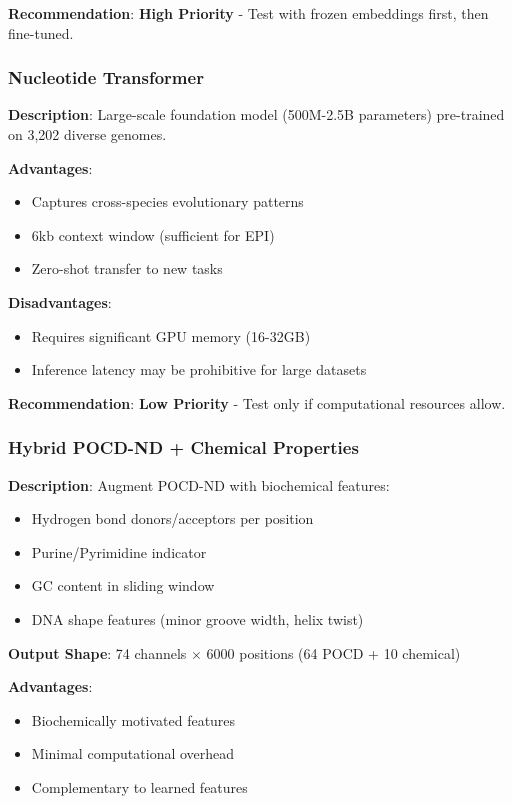 \documentclass[11pt,a4paper]{article}
\begin{document}
\textbf{Recommendation}: \textcolor{positive}{\textbf{High Priority}} - Test with frozen embeddings first, then fine-tuned.

\subsubsection{Nucleotide Transformer}

\textbf{Description}: Large-scale foundation model (500M-2.5B parameters) pre-trained on 3,202 diverse genomes.

\textbf{Advantages}:
\begin{itemize}
    \item Captures cross-species evolutionary patterns
    \item 6kb context window (sufficient for EPI)
    \item Zero-shot transfer to new tasks
\end{itemize}

\textbf{Disadvantages}:
\begin{itemize}
    \item Requires significant GPU memory (16-32GB)
    \item Inference latency may be prohibitive for large datasets
\end{itemize}

\textbf{Recommendation}: \textcolor{uncertain}{\textbf{Low Priority}} - Test only if computational resources allow.

\subsubsection{Hybrid POCD-ND + Chemical Properties}

\textbf{Description}: Augment POCD-ND with biochemical features:
\begin{itemize}
    \item Hydrogen bond donors/acceptors per position
    \item Purine/Pyrimidine indicator
    \item GC content in sliding window
    \item DNA shape features (minor groove width, helix twist)
\end{itemize}

\textbf{Output Shape}: 74 channels $\times$ 6000 positions (64 POCD + 10 chemical)

\textbf{Advantages}:
\begin{itemize}
    \item Biochemically motivated features
    \item Minimal computational overhead
    \item Complementary to learned features
\end{itemize}
\end{document}
